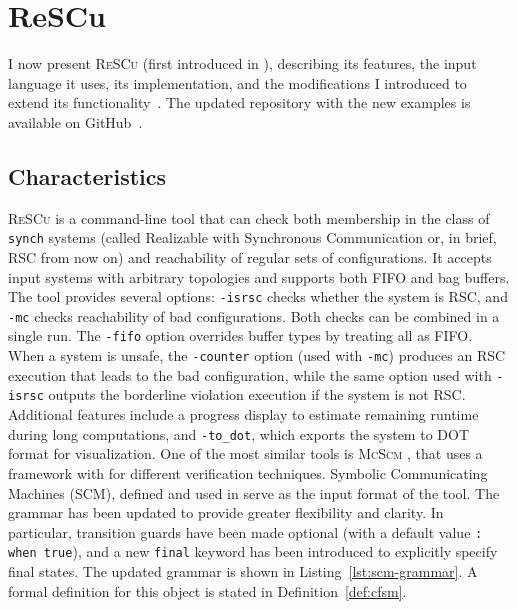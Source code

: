 \chapter{ReSCu}\label{sec:rescu}
I now present \textsc{ReSCu} (first introduced in \cite{desgeorges2023rsc, di2023multiparty, guizouarn2023communicating}),
describing its features, the input
language it uses, its implementation, and the modifications I introduced to
extend its functionality~\cite{rescuoriginalrepo}. The updated repository with 
the new examples is available on GitHub~\cite{rescurepo}.

\section{Characteristics}
\textsc{ReSCu} is a command-line tool that can check both membership in the 
class of \verb|synch| systems (called Realizable with Synchronous Communication 
or, in brief, RSC from now on) and reachability of regular sets of configurations. It 
accepts input systems with arbitrary topologies and supports both FIFO and 
bag buffers. The tool provides several options: 
\verb|-isrsc| checks whether the system is RSC, and \verb|-mc| checks reachability of 
bad configurations. Both checks can be combined in a single run. The \verb|-fifo| option 
overrides buffer types by treating all as FIFO. When a system is unsafe, the 
\verb|-counter| option (used with \verb|-mc|) produces an RSC execution that leads 
to the bad configuration, while the same option used with \verb|-isrsc| outputs the 
borderline violation execution if the system is not RSC. Additional features include 
a progress display to estimate remaining runtime during long computations, and 
\verb|-to_dot|, which exports the system to DOT format for visualization.
One of the most similar tools is \textsc{McScm} \cite{heussner2012mcscm}, that
uses a framework with for different verification techniques. 
Symbolic Communicating Machines (SCM), defined and used in \cite{brand1983communicating} 
serve as the input format of the tool.
The grammar has been updated to provide greater flexibility and clarity. In
particular, transition guards have been made optional (with a default value
\verb|: when true|), and a new \verb|final| keyword has been introduced to
explicitly specify final states. The updated grammar is shown in
Listing~\ref{lst:scm-grammar}. 
A formal definition for this object is stated
in Definition~\ref{def:cfsm}.


